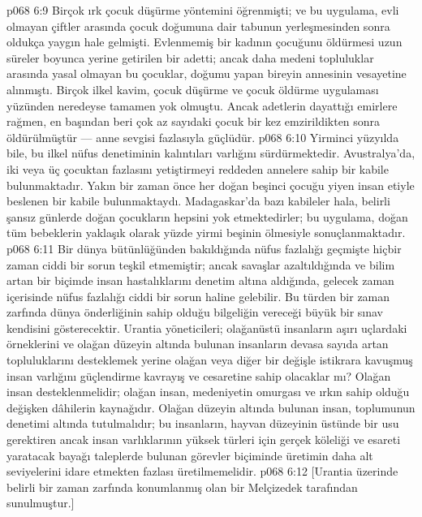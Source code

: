\vs p068 6:9 Birçok ırk çocuk düşürme yöntemini öğrenmişti; ve bu uygulama, evli olmayan çiftler arasında çocuk doğumuna dair tabunun yerleşmesinden sonra oldukça yaygın hale gelmişti. Evlenmemiş bir kadının çocuğunu öldürmesi uzun süreler boyunca yerine getirilen bir adetti; ancak daha medeni topluluklar arasında yasal olmayan bu çocuklar, doğumu yapan bireyin annesinin vesayetine alınmıştı. Birçok ilkel kavim, çocuk düşürme ve çocuk öldürme uygulaması yüzünden neredeyse tamamen yok olmuştu. Ancak adetlerin dayattığı emirlere rağmen, en başından beri çok az sayıdaki çocuk bir kez emzirildikten sonra öldürülmüştür --- anne sevgisi fazlasıyla güçlüdür.
\vs p068 6:10 Yirminci yüzyılda bile, bu ilkel nüfus denetiminin kalıntıları varlığını sürdürmektedir. Avustralya’da, iki veya üç çocuktan fazlasını yetiştirmeyi reddeden annelere sahip bir kabile bulunmaktadır. Yakın bir zaman önce her doğan beşinci çocuğu yiyen insan etiyle beslenen bir kabile bulunmaktaydı. Madagaskar’da bazı kabileler hala, belirli şansız günlerde doğan çocukların hepsini yok etmektedirler; bu uygulama, doğan tüm bebeklerin yaklaşık olarak yüzde yirmi beşinin ölmesiyle sonuçlanmaktadır.
\vs p068 6:11 Bir dünya bütünlüğünden bakıldığında nüfus fazlalığı geçmişte hiçbir zaman ciddi bir sorun teşkil etmemiştir; ancak savaşlar azaltıldığında ve bilim artan bir biçimde insan hastalıklarını denetim altına aldığında, gelecek zaman içerisinde nüfus fazlalığı ciddi bir sorun haline gelebilir. Bu türden bir zaman zarfında dünya önderliğinin sahip olduğu bilgeliğin vereceği büyük bir sınav kendisini gösterecektir. Urantia yöneticileri; olağanüstü insanların aşırı uçlardaki örneklerini ve olağan düzeyin altında bulunan insanların devasa sayıda artan topluluklarını desteklemek yerine olağan veya diğer bir değişle istikrara kavuşmuş insan varlığını güçlendirme kavrayış ve cesaretine sahip olacaklar mı? Olağan insan desteklenmelidir; olağan insan, medeniyetin omurgası ve ırkın sahip olduğu değişken dâhilerin kaynağıdır. Olağan düzeyin altında bulunan insan, toplumunun denetimi altında tutulmalıdır; bu insanların, hayvan düzeyinin üstünde bir usu gerektiren ancak insan varlıklarının yüksek türleri için gerçek köleliği ve esareti yaratacak bayağı taleplerde bulunan görevler biçiminde üretimin daha alt seviyelerini idare etmekten fazlası üretilmemelidir.
\vs p068 6:12 [Urantia üzerinde belirli bir zaman zarfında konumlanmış olan bir Melçizedek tarafından sunulmuştur.]
